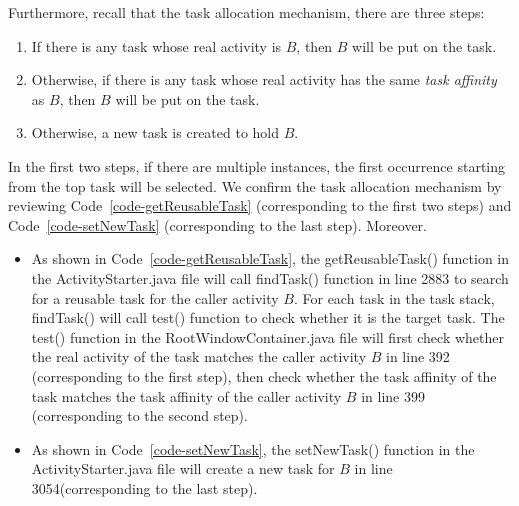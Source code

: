 {    Furthermore, recall that the task allocation mechanism, there are three steps:
    \begin{enumerate}
        \item If there is any task whose real activity is $B$, then $B$ will be put on the task. %
        \item Otherwise, if there is any task whose real activity has the same \emph{task affinity} as $B$, then $B$ will be put on the task. %
        \item Otherwise, a new task is created to hold $B$. 
    \end{enumerate}
        In the first two steps, if there are multiple instances, the first occurrence starting from the top task will be selected. 
We confirm the task allocation mechanism by reviewing Code~\ref{code-getReusableTask} (corresponding to the first two steps) and Code~\ref{code-setNewTask} (corresponding to the last step). Moreover.
\begin{itemize}
    \item As shown in Code~\ref{code-getReusableTask}, the getReusableTask() function in the ActivityStarter.java file will call findTask() function in line 2883 to search for a reusable task for the caller activity $B$. For each task in the task stack, findTask() will call test() function to check whether it is the target task. The test() function in the RootWindowContainer.java file will first check whether the real activity of the task matches the caller activity $B$ in line 392 (corresponding to the first step), then check whether the task affinity of the task matches the task affinity of the caller activity $B$ in line 399 (corresponding to the second step). 
    \item As shown in Code~\ref{code-setNewTask}, the setNewTask() function in the ActivityStarter.java file will create a new task for $B$ in line 3054(corresponding to the last step).
\end{itemize}

}
